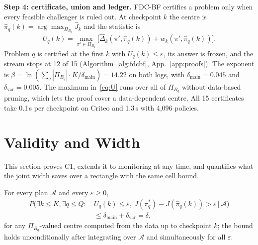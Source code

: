 \documentclass[sigconf,anonymous,review]{acmart}
\newcommand{\cA}{\mathcal{A}}
\newcommand{\eps}{\varepsilon}
\newcommand{\dmain}{\delta_{\text{main}}}
\newcommand{\dvar}{\delta_{\text{var}}}
\begin{document}
\textbf{Step 4: certificate, union and ledger.} FDC-BF certifies a problem only when every feasible challenger is ruled out. At checkpoint $k$ the centre is $\hat\pi_q(k) = \arg\max_{\Pi_{B_q}} \hat J_k$ and the statistic is
\begin{equation}\label{eq:U}
U_q(k) = \max_{\pi' \in \Pi_{B_q}}\big[\hat\Delta_k(\pi', \hat\pi_q(k)) + w_k(\pi', \hat\pi_q(k))\big].
\end{equation}
Problem $q$ is certified at the first $k$ with $U_q(k) \le \eps$, its answer is frozen, and the stream stops at 12 of 15 (Algorithm~\ref{alg:fdcbf}, App.~\ref{app:proofs}). The exponent is $\beta = \ln(\sum_q |\Pi_{B_q}| \cdot K/\dmain) = 14.22$ on both logs, with $\dmain = 0.045$ and $\dvar = 0.005$. The maximum in~\eqref{eq:U} runs over all of $\Pi_{B_q}$ without data-based pruning, which lets the proof cover a data-dependent centre. All 15 certificates take 0.1\,s per checkpoint on Criteo and 1.3\,s with 4,096 policies.

\section{Validity and Width}\label{sec:validity}

This section proves C1, extends it to monitoring at any time, and quantifies what the joint width saves over a rectangle with the same cell bound.

\begin{theorem}\label{thm:fdcbet}
For every plan $\cA$ and every $\eps \ge 0$,
\[
\begin{aligned}
P\big(\exists k \le K, \exists q \le Q:\ & U_q(k) \le \eps,\ J(\pi^*_q) - J(\hat\pi_q(k)) > \eps \,\big|\, \cA\big)\\
&\le \dmain + \dvar = \delta,
\end{aligned}
\]
for any $\Pi_{B_q}$-valued centre computed from the data up to checkpoint $k$; the bound holds unconditionally after integrating over $\cA$ and simultaneously for all $\eps$.
\end{theorem}
\end{document}
